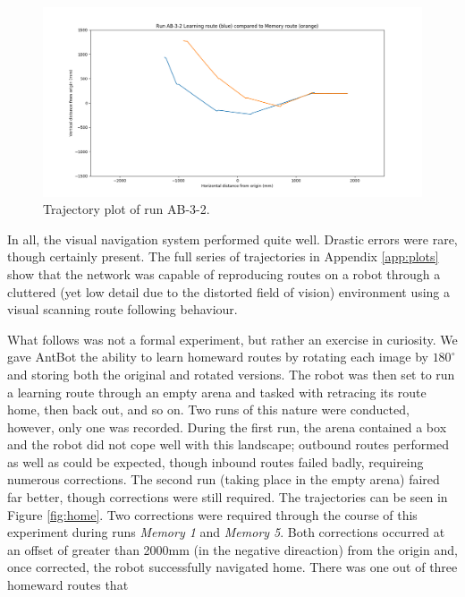 \documentclass[a4paper,12pt,twoside,openright]{article}
\begin{document}
\begin{figure}
 \centering
  \includegraphics[width=\textwidth]{AB-3-2}
  \caption{
    \label{fig:ab-3-2-inside} Trajectory plot of run AB-3-2.
  }
\end{figure}

In all, the visual navigation system performed quite well. Drastic errors were rare, though certainly present. The full series
of trajectories in Appendix \ref{app:plots} show that the network was capable of reproducing routes on a robot through a
cluttered (yet low detail due to the distorted field of vision) environment using a visual scanning route following behaviour.
\newline

What follows was not a formal experiment, but rather an exercise in curiosity. We gave AntBot the ability to learn homeward
routes by rotating each image by $180^{\circ}$ and storing both the original and rotated versions. The robot was then set
to run a learning route through an empty arena and tasked with retracing its route home, then back out, and so on. Two runs
of this nature were conducted, however, only one was recorded. During the first run, the arena contained a box and the
robot did not cope well with this landscape; outbound routes performed as well as could be expected, though inbound routes
failed badly, requireing numerous corrections. The second run (taking place in the empty arena) faired far better, though
corrections were still required. The trajectories can be seen in Figure \ref{fig:home}. Two corrections were required
through the course of this experiment during runs \textit{Memory 1} and \textit{Memory 5}. Both corrections occurred
at an offset of greater than 2000mm (in the negative direaction) from the origin and, once corrected, the robot successfully
navigated home. There was one out of three homeward routes that  
\end{document}
